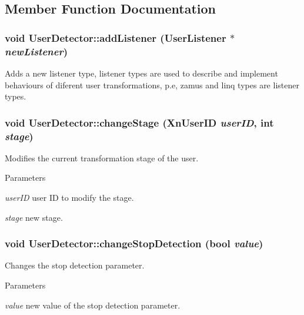 \subsection{Member Function Documentation}
\hypertarget{classUserDetector_ab7e1f7d8cbc37dcecd6b224fdd18f6c2}{
\subsubsection[{addListener}]{\setlength{\rightskip}{0pt plus 5cm}void UserDetector::addListener ({\bf UserListener} $\ast$ {\em newListener})}}
\label{classUserDetector_ab7e1f7d8cbc37dcecd6b224fdd18f6c2}
Adds a new listener type, listener types are used to describe and implement behaviours of diferent user transformations, p.e, zamus and linq types are listener types. \hypertarget{classUserDetector_a12b1f74ff23077f84c4c4bf01260e91b}{
\subsubsection[{changeStage}]{\setlength{\rightskip}{0pt plus 5cm}void UserDetector::changeStage (XnUserID {\em userID}, \/  int {\em stage})}}
\label{classUserDetector_a12b1f74ff23077f84c4c4bf01260e91b}
Modifies the current transformation stage of the user. 
\begin{DoxyParams}{Parameters}
\item[{\em userID}]user ID to modify the stage. \item[{\em stage}]new stage. \end{DoxyParams}
\hypertarget{classUserDetector_ae0547a63d4a2d94663dd41ab347ffb2b}{
\subsubsection[{changeStopDetection}]{\setlength{\rightskip}{0pt plus 5cm}void UserDetector::changeStopDetection (bool {\em value})}}
\label{classUserDetector_ae0547a63d4a2d94663dd41ab347ffb2b}
Changes the stop detection parameter. 
\begin{DoxyParams}{Parameters}
\item[{\em value}]new value of the stop detection parameter. \end{DoxyParams}
